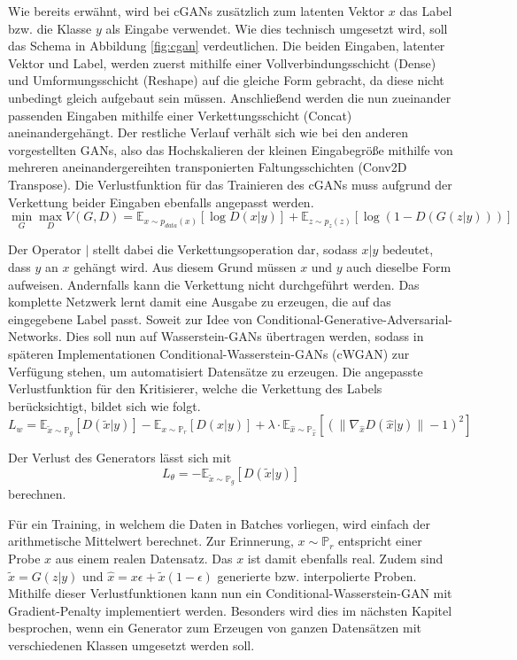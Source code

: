 Wie bereits erwähnt, wird bei cGANs zusätzlich zum latenten Vektor $x$ das Label
bzw. die Klasse $y$ als Eingabe verwendet. Wie dies technisch umgesetzt wird,
soll das Schema in Abbildung \ref{fig:cgan} verdeutlichen. Die beiden Eingaben,
latenter Vektor und Label, werden zuerst mithilfe einer Vollverbindungsschicht
(Dense) und Umformungsschicht (Reshape) auf die gleiche Form gebracht, da diese
nicht unbedingt gleich aufgebaut sein müssen. Anschließend werden die nun
zueinander passenden Eingaben mithilfe einer Verkettungsschicht (Concat)
aneinandergehängt. Der restliche Verlauf verhält sich wie bei den anderen
vorgestellten GANs, also das Hochskalieren der kleinen Eingabegröße mithilfe von
mehreren aneinandergereihten transponierten Faltungsschichten (Conv2D
Transpose). Die Verlustfunktion für das Trainieren des cGANs muss aufgrund der
Verkettung beider Eingaben ebenfalls angepasst werden. 
\[
\min_G \max_D V(G, D) = \mathbb{E}_{x \sim p_{data}(x)}\left[ \log D(x \lvert y) \right] + \mathbb{E}_{z \sim p_z(z)}\left[ \log (1 - D(G(z \lvert y))) \right]
\]

Der Operator $\lvert$ stellt dabei die Verkettungsoperation dar, sodass $x
\lvert y$ bedeutet, dass $y$ an $x$ gehängt wird. Aus diesem Grund müssen $x$
und $y$ auch dieselbe Form aufweisen. Andernfalls kann die Verkettung nicht
durchgeführt werden. Das komplette Netzwerk lernt damit eine Ausgabe zu
erzeugen, die auf das eingegebene Label passt. Soweit zur Idee von
Conditional-Generative-Adversarial-Networks. Dies soll nun auf Wasserstein-GANs
übertragen werden, sodass in späteren Implementationen
Conditional-Wasserstein-GANs (cWGAN) zur Verfügung stehen, um automatisiert
Datensätze zu erzeugen. Die angepasste Verlustfunktion für den Kritisierer,
welche die Verkettung des Labels berücksichtigt, bildet sich wie folgt.
\[
L_w = \mathbb{E}_{\tilde{x} \sim \mathbb{P}_g}\left[D(\tilde{x} \lvert y)\right] -
    \mathbb{E}_{x \sim \mathbb{P}_r}\left[D(x \lvert y)\right] +
    \lambda \cdot \mathbb{E}_{\hat{x} \sim \mathbb{P}_{\hat{x}}}\left[(\|\nabla_{\hat{x}} D(\hat{x} \lvert y)\| - 1)^2\right]
\]

Der Verlust des Generators lässt sich mit
\[
L_\theta = -\mathbb{E}_{\tilde{x} \sim \mathbb{P}_g} \left[D(\tilde{x} \lvert y)\right]
\]
berechnen.

Für ein Training, in welchem die Daten in Batches vorliegen, wird einfach der
arithmetische Mittelwert berechnet.  Zur Erinnerung, $x \sim \mathbb{P}_r$
entspricht einer Probe $x$ aus einem realen Datensatz. Das $x$ ist damit
ebenfalls real. Zudem sind $\tilde{x} = G(z \lvert y)$ und $\hat{x} = x \epsilon
+ \tilde{x} (1 - \epsilon)$ generierte bzw.  interpolierte Proben. Mithilfe
dieser Verlustfunktionen kann nun ein Conditional-Wasserstein-GAN mit
Gradient-Penalty implementiert werden. Besonders wird dies im nächsten Kapitel
besprochen, wenn ein Generator zum Erzeugen von ganzen Datensätzen mit
verschiedenen Klassen umgesetzt werden soll. 

